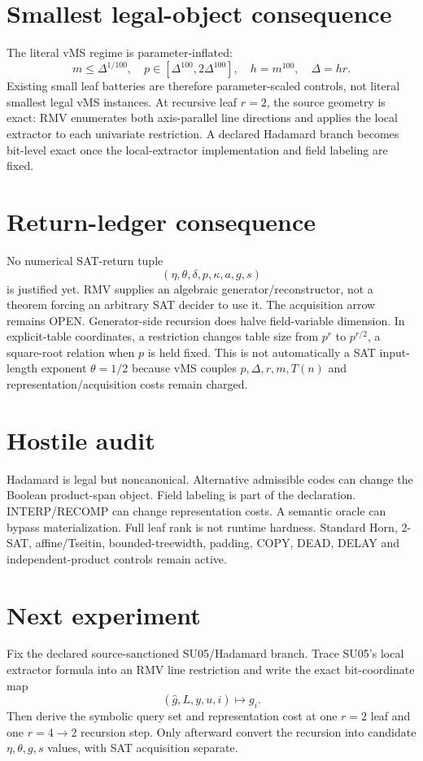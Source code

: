 \documentclass[11pt]{article}
\begin{document}
\section*{Smallest legal-object consequence}
The literal vMS regime is parameter-inflated:
\[
m\le\Delta^{1/100},\quad p\in[\Delta^{100},2\Delta^{100}],
\quad h=m^{100},\quad\Delta=hr.
\]
Existing small leaf batteries are therefore parameter-scaled controls, not literal smallest legal vMS instances.
At recursive leaf $r=2$, the source geometry is exact: RMV enumerates both axis-parallel line directions and applies the local extractor to each univariate restriction. A declared Hadamard branch becomes bit-level exact once the local-extractor implementation and field labeling are fixed.
\section*{Return-ledger consequence}
No numerical SAT-return tuple
\[
(\eta,\theta,\delta,p,\kappa,a,g,s)
\]
is justified yet. RMV supplies an algebraic generator/reconstructor, not a theorem forcing an arbitrary SAT decider to use it. The acquisition arrow remains OPEN.
Generator-side recursion does halve field-variable dimension. In explicit-table coordinates, a restriction changes table size from $p^r$ to $p^{r/2}$, a square-root relation when $p$ is held fixed. This is not automatically a SAT input-length exponent $\theta=1/2$ because vMS couples $p,\Delta,r,m,T(n)$ and representation/acquisition costs remain charged.
\section*{Hostile audit}
Hadamard is legal but noncanonical. Alternative admissible codes can change the Boolean product-span object. Field labeling is part of the declaration. INTERP/RECOMP can change representation costs. A semantic oracle can bypass materialization. Full leaf rank is not runtime hardness. Standard Horn, 2-SAT, affine/Tseitin, bounded-treewidth, padding, COPY, DEAD, DELAY and independent-product controls remain active.
\section*{Next experiment}
Fix the declared source-sanctioned SU05/Hadamard branch. Trace SU05's local extractor formula into an RMV line restriction and write the exact bit-coordinate map
\[
(\widehat g,L,y,u,i)\longmapsto g_i.
\]
Then derive the symbolic query set and representation cost at one $r=2$ leaf and one $r=4\to2$ recursion step. Only afterward convert the recursion into candidate $\eta,\theta,g,s$ values, with SAT acquisition separate.
\end{document}
